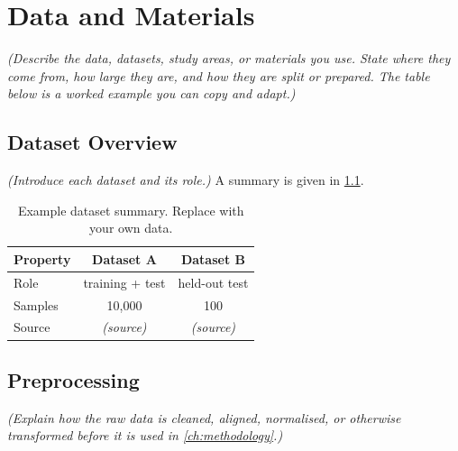 \chapter{Data and Materials}
\label{ch:data}

\emph{(Describe the data, datasets, study areas, or materials you use. State
where they come from, how large they are, and how they are split or prepared.
The table below is a worked example you can copy and adapt.)}

\section{Dataset Overview}
\label{sec:data-overview}

\emph{(Introduce each dataset and its role.)} A summary is given in
\cref{tab:datasets}.

\begin{table}[ht]
  \centering
  \caption{Example dataset summary. Replace with your own data.}
  \label{tab:datasets}
  \begin{tabular}{l c c}
    \toprule
    Property & Dataset A & Dataset B \\
    \midrule
    Role     & training + test & held-out test \\
    Samples  & 10{,}000 & 100 \\
    Source   & \emph{(source)} & \emph{(source)} \\
    \bottomrule
  \end{tabular}
\end{table}

\section{Preprocessing}
\label{sec:data-prep}

\emph{(Explain how the raw data is cleaned, aligned, normalised, or otherwise
transformed before it is used in \cref{ch:methodology}.)}
